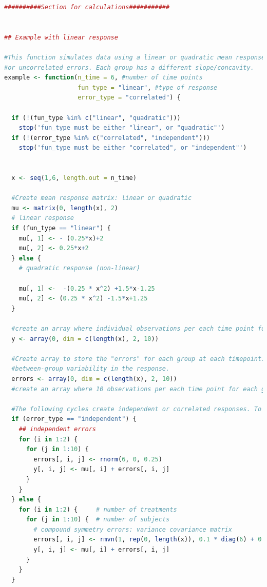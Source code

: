 \documentclass[
]{article}
\begin{document}
\begin{lstlisting}[language=R]
##########Section for calculations###########


## Example with linear response

#This function simulates data using a linear or quadratic mean response and each with correlated
#or uncorrelated errors. Each group has a different slope/concavity.
example <- function(n_time = 6, #number of time points
                    fun_type = "linear", #type of response
                    error_type = "correlated") {
  
  if (!(fun_type %in% c("linear", "quadratic")))
    stop('fun_type must be either "linear", or "quadratic"')
  if (!(error_type %in% c("correlated", "independent")))
    stop('fun_type must be either "correlated", or "independent"')
  
  
  x <- seq(1,6, length.out = n_time)
  
  #Create mean response matrix: linear or quadratic
  mu <- matrix(0, length(x), 2)
  # linear response
  if (fun_type == "linear") {
    mu[, 1] <- - (0.25*x)+2  
    mu[, 2] <- 0.25*x+2
  } else {
    # quadratic response (non-linear)
    
    mu[, 1] <-  -(0.25 * x^2) +1.5*x-1.25
    mu[, 2] <- (0.25 * x^2) -1.5*x+1.25
  }
  
  #create an array where individual observations per each time point for each group are to be stored. Currently using 10 observations per timepoint
  y <- array(0, dim = c(length(x), 2, 10))
  
  #Create array to store the "errors" for each group at each timepoint. The "errors" are the 
  #between-group variability in the response.
  errors <- array(0, dim = c(length(x), 2, 10))
  #create an array where 10 observations per each time point for each group are to be stored
  
  #The following cycles create independent or correlated responses. To each value of mu (mean response per group) a randomly generated error (correlated or uncorrelated) is added and thus the individual response is created.
  if (error_type == "independent") {
    ## independent errors
    for (i in 1:2) {
      for (j in 1:10) {
        errors[, i, j] <- rnorm(6, 0, 0.25)
        y[, i, j] <- mu[, i] + errors[, i, j]
      }
    }
  } else {
    for (i in 1:2) {     # number of treatments
      for (j in 1:10) {  # number of subjects
        # compound symmetry errors: variance covariance matrix
        errors[, i, j] <- rmvn(1, rep(0, length(x)), 0.1 * diag(6) + 0.25 * matrix(1, 6, 6))
        y[, i, j] <- mu[, i] + errors[, i, j]
      }
    }
  }    
  

\end{lstlisting}
\end{document}
